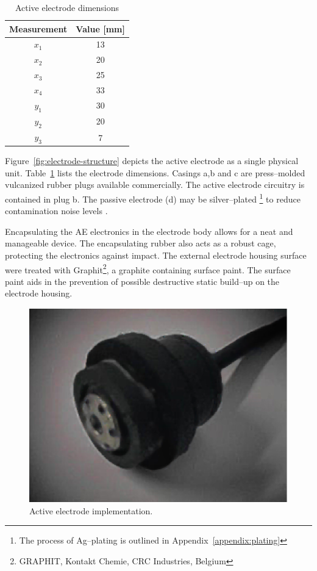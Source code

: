 \begin{table}
\begin{center}	
	\begin{tabular}[htpb]{|c|c|} \hline
	Measurement & Value [mm] \\ \hline
	$x_1$ & 13 \\
	$x_2$ & 20 \\ 
	$x_3$ & 25 \\
	$x_4$ & 33 \\
	$y_1$ & 30 \\
	$y_2$ & 20 \\
	$y_3$ & 7 \\
	\hline
	\end{tabular}
	\caption{Active electrode dimensions}
	\label{table:ae-dim}
\end{center}	
\end{table}

Figure~\vref{fig:electrode-structure} depicts the active electrode as
a single physical unit. Table~\ref{table:ae-dim} lists the electrode
dimensions. Casings a,b and c are press--molded vulcanized rubber
plugs available commercially. The active electrode circuitry is
contained in plug b. The passive electrode (d) may be silver--plated
\footnote{The process of Ag--plating is outlined in
Appendix~\ref{appendix:plating} } to reduce contamination noise levels
\cite{electrode-stability}. 

Encapsulating the AE electronics in the electrode body allows for a
neat and manageable device. The encapsulating rubber also acts as a
robust cage, protecting the electronics against impact. The external
electrode housing surface were treated with Graphit\footnote{GRAPHIT,
Kontakt Chemie, CRC Industries, Belgium}, a graphite containing
surface paint. The surface paint aids in the prevention of possible
destructive static build--up on the electrode housing.


\begin{center}
\begin{figure}[htbp]
	\begin{center}
	\includegraphics{electrode.ps}
	\caption{Active electrode implementation.}
	\label{fig:electrode-implimentation}
	\end{center}
\end{figure}
\end{center}

